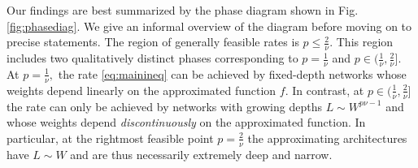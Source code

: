 \documentclass[final, 12pt]{colt2018}
\begin{document}
Our findings are best summarized by the phase diagram shown in Fig. \ref{fig:phasediag}. We give an informal overview of the diagram before moving on to precise statements. The region of generally feasible rates is $p\le \frac{2}{\nu}.$ This region includes two qualitatively distinct phases corresponding to $p=\frac{1}{\nu}$ and $p\in (\frac{1}{\nu}, \frac{2}{\nu}]$. At $p=\frac{1}{\nu},$ the rate \eqref{eq:mainineq} can be achieved by fixed-depth networks whose weights depend linearly on the approximated function $f$. In contrast, at $p\in (\frac{1}{\nu}, \frac{2}{\nu}]$ the rate can only be achieved by networks with growing depths $L\sim W^{p\nu-1}$ and whose weights depend \emph{discontinuously} on the approximated function. In particular, at the rightmost feasible point $p=\frac{2}{\nu}$ the approximating architectures have $L\sim W$ and are thus necessarily extremely deep and narrow. 
\end{document}
